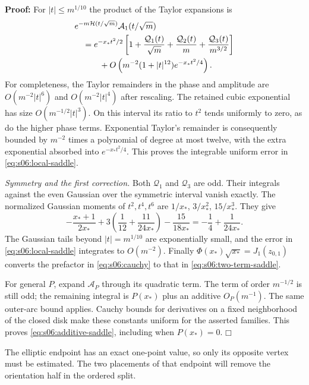 \documentclass[a4paper,10pt]{article}
\numberwithin{equation}{section}
\theoremstyle{paperplain}
\theoremstyle{paperremark}
\theoremstyle{paperplain}
\newenvironment{prf}{\noindent \textbf{Proof: }}{\hfill $\mdlgwhtsquare$\par\addvspace{0.5\baselineskip}}
\begin{document}
\begin{prf}
For $|t|\leq m^{1/10}$ the product of the Taylor expansions is
\begin{align}
 &e^{-m\mathcal H(t/\sqrt m)}\mathcal A_1(t/\sqrt m)\notag\\
 &\quad=e^{-x_*t^2/2}
 \left[1+\frac{\mathcal Q_1(t)}{\sqrt m}
         +\frac{\mathcal Q_2(t)}m
         +\frac{\mathcal Q_3(t)}{m^{3/2}}\right]\notag\\
 &\qquad\quad
   +O\left(m^{-2}(1+|t|^{12})e^{-x_*t^2/4}\right).
 \label{eq:s06:local-saddle}
\end{align}
For completeness, the Taylor remainders in the phase and amplitude
are $O(m^{-2}|t|^6)$ and $O(m^{-2}|t|^4)$ after rescaling.
The retained cubic exponential has size
$O(m^{-1/2}|t|^3)$. On this interval its ratio to $t^2$ tends
uniformly to zero, as do the higher phase terms. Exponential
Taylor's remainder is consequently bounded by $m^{-2}$ times a
polynomial of degree at most twelve, with the extra exponential
absorbed into $e^{-x_*t^2/4}$. This proves the integrable uniform
error in \eqref{eq:s06:local-saddle}.

\emph{Symmetry and the first correction.}
Both $\mathcal Q_1$ and $\mathcal Q_3$ are odd. Their integrals
against the even Gaussian over the symmetric interval vanish
exactly. The normalized Gaussian moments of $t^2,t^4,t^6$ are
$1/x_*$, $3/x_*^2$, $15/x_*^3$. They give
\[
 -\frac{x_*+1}{2x_*}
 +3\left(\frac1{12}+\frac{11}{24x_*}\right)
 -\frac{15}{18x_*}
 =-\frac14+\frac1{24x_*}.
\]
The Gaussian tails beyond $|t|=m^{1/10}$ are exponentially small,
and the error in \eqref{eq:s06:local-saddle} integrates to
$O(m^{-2})$. Finally
$\Phi(x_*)\sqrt{x_*}=J_1(z_{0,1})$ converts the prefactor in
\eqref{eq:s06:cauchy} to that in
\eqref{eq:s06:two-term-saddle}.

For general $P$, expand $\mathcal A_P$ through its quadratic term.
The term of order $m^{-1/2}$ is still odd; the remaining integral
is $P(x_*)$ plus an additive $O_P(m^{-1})$.
The same outer-arc bound applies. Cauchy bounds for derivatives on
a fixed neighborhood of the closed disk make these constants
uniform for the asserted families. This proves
\eqref{eq:s06:additive-saddle}, including when $P(x_*)=0$.
\end{prf}

The elliptic endpoint has an exact one-point value, so only its
opposite vertex must be estimated. The two placements of that
endpoint will remove the orientation half in the ordered split.
\end{document}
